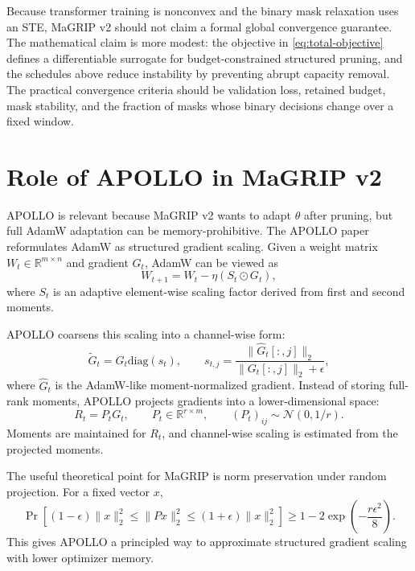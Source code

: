 \documentclass[11pt]{article}
\newcommand{\R}{\mathbb{R}}
\newcommand{\diag}{\mathrm{diag}}
\begin{document}
Because transformer training is nonconvex and the binary mask relaxation uses an STE, MaGRIP v2 should not claim a formal global convergence guarantee. The mathematical claim is more modest: the objective in \eqref{eq:total-objective} defines a differentiable surrogate for budget-constrained structured pruning, and the schedules above reduce instability by preventing abrupt capacity removal. The practical convergence criteria should be validation loss, retained budget, mask stability, and the fraction of masks whose binary decisions change over a fixed window.

\section{Role of APOLLO in MaGRIP v2}

APOLLO is relevant because MaGRIP v2 wants to adapt $\theta$ after pruning, but full AdamW adaptation can be memory-prohibitive. The APOLLO paper reformulates AdamW as structured gradient scaling. Given a weight matrix $W_t\in\R^{m\times n}$ and gradient $G_t$, AdamW can be viewed as
\begin{equation}
  W_{t+1}
  =
  W_t
  -
  \eta
  \left(
    S_t \odot G_t
  \right),
\end{equation}
where $S_t$ is an adaptive element-wise scaling factor derived from first and second moments.

APOLLO coarsens this scaling into a channel-wise form:
\begin{equation}
  \widetilde{G}_t
  =
  G_t\diag(s_t),
  \qquad
  s_{t,j}
  =
  \frac{\|\widehat{G}_t[:,j]\|_2}{\|G_t[:,j]\|_2+\epsilon},
\end{equation}
where $\widehat{G}_t$ is the AdamW-like moment-normalized gradient. Instead of storing full-rank moments, APOLLO projects gradients into a lower-dimensional space:
\begin{equation}
  R_t = P_tG_t,
  \qquad
  P_t\in\R^{r\times m},
  \qquad
  (P_t)_{ij}\sim\mathcal{N}(0,1/r).
\end{equation}
Moments are maintained for $R_t$, and channel-wise scaling is estimated from the projected moments.

The useful theoretical point for MaGRIP is norm preservation under random projection. For a fixed vector $x$,
\begin{equation}
  \Pr
  \left[
    (1-\epsilon)\|x\|_2^2
    \leq
    \|Px\|_2^2
    \leq
    (1+\epsilon)\|x\|_2^2
  \right]
  \geq
  1 - 2\exp\left(-\frac{r\epsilon^2}{8}\right).
\end{equation}
This gives APOLLO a principled way to approximate structured gradient scaling with lower optimizer memory.
\end{document}
